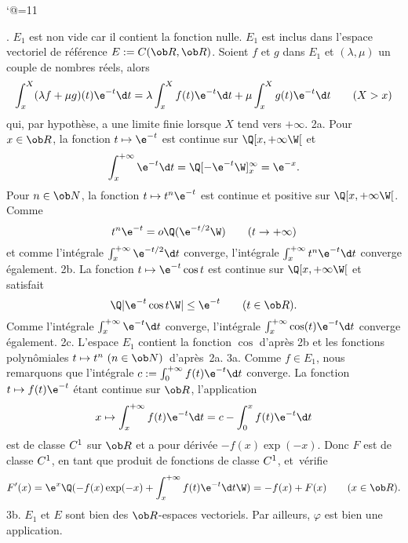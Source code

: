 \catcode`@=11\relax



\def\LD@Maths@Exercice@Display{\ignorespaces\LD@Exo@@Exo}%


\vglue-10mm%
\bigskip
\bigskip
\vfill
{}.  $E_1$ est non vide car il contient la fonction nulle. \pn 
$E_1$ est inclus dans l'espace vectoriel de r\'ef\'erence $E:=\sc C(\ob R,\ob R)$. \pn
Soient $f$ et $g$ dans $E_1$ et $(\lambda,\mu) $
un couple de nombres r\'eels, alors
$$
\int_x^X(\lambda f+\mu g)(t)\e^{-t}\d t=\lambda\int_x^Xf(t)\e^{-t}\d t+
\mu \int_x^Xg(t)\e^{-t}\d t\qquad(X>x)
$$
qui, par hypoth\`ese, a une limite finie lorsque $X$ tend vers $+\infty $.
\medskip
\noindent
2a.  Pour $x\in\ob R$, la fonction $t\mapsto\e^{-t}$ est continue sur $\Q[x,+\infty\W[$ et 
$$
\int_x^{+\infty}\e^{-t}\d t=\Q[-\e^{-t}\W]_x^{\infty}=\e^{-x}.
$$ 
\smallskip
\noindent
Pour $n\in\ob N$, la fonction $t\mapsto t^n\e^{-t}$ est continue et positive sur $\Q[x,+\infty\W[$. Comme 
$$
t^n\e^{-t}=o\Q(\e^{-t/2}\W)\qquad(t\to+\infty)
$$ 
et comme l'int\'egrale $\int_x^{+\infty}\e^{-t/2}\d t$ converge, l'int\'egrale  $\int_x^{+\infty}t^n\e^{-t}\d t$ converge \'egalement. 
\medskip
\noindent
2b. La fonction $t\mapsto \e^{-t}\cos t$ est continue sur $\Q[x,+\infty \W[$ et satisfait 
$$
\Q|\e^{-t}\cos t\W|\le \e^{-t}\qquad(t\in\ob R).
$$ 
Comme l'int\'egrale $\int_x^{+\infty}\e^{-t}\d t$ converge, l'int\'egrale  $\int_x^{+\infty}\cos(t)\e^{-t}\d t$ converge \'egalement. 
\medskip
\noindent
2c. L'espace $E_1$ contient la fonction $\cos$ d'apr\`es 2b et les fonctions polyn\^omiales $t\mapsto t^n\  (n\in\ob N)$~d'apr\`es~2a.
\medskip
\noindent
3a. Comme $f\in E_1$, nous remarquons que l'int\'egrale $c:=\int_0^{+\infty}f(t)\e^{-t}\d t$ converge. \pn
La fonction $t\mapsto f(t)\e^{-t}$ \'etant continue sur $\ob R$, l'application  
$$
x\mapsto \int_x^{+\infty }
f(t)\e^{-t}\d t=c-\int_0^xf(t)\e^{-t}\d t
$$ 
est de classe $\sc C^1$ sur $\ob R$ et a pour d\'eriv\'ee $-f(x)\exp(-x)$. 
Donc $F$ est de classe $\sc C^1$, en tant que produit de fonctions de classe $\sc C^1$, et~v\'erifie 
$$
F'(x)=\e^x\Q(-f(x)\exp(-x)+\int_x^{+\infty }f(t)\e^{-t}\d t\W)=-f(x)+F(x)\qquad (x\in\ob R).
$$
3b.  $E_1$ et $E$ sont bien des $\ob R$-espaces vectoriels. Par ailleurs, $\varphi$ est bien une application.
